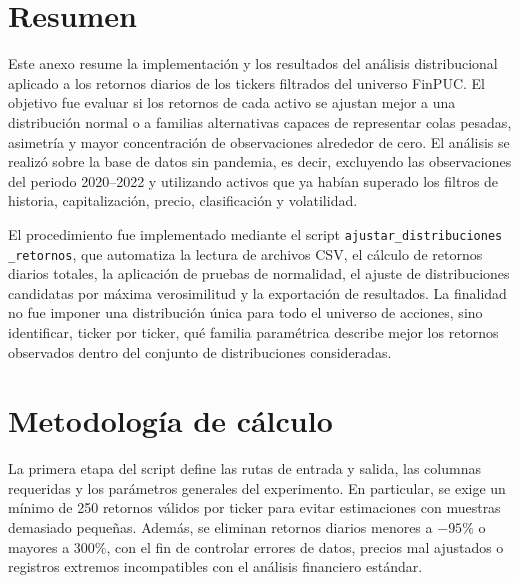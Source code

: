\section*{Resumen}

Este anexo resume la implementaci\'on y los resultados del an\'alisis distribucional aplicado a los retornos diarios de los tickers filtrados del universo FinPUC. El objetivo fue evaluar si los retornos de cada activo se ajustan mejor a una distribuci\'on normal o a familias alternativas capaces de representar colas pesadas, asimetr\'ia y mayor concentraci\'on de observaciones alrededor de cero. El an\'alisis se realiz\'o sobre la base de datos sin pandemia, es decir, excluyendo las observaciones del periodo 2020--2022 y utilizando activos que ya hab\'ian superado los filtros de historia, capitalizaci\'on, precio, clasificaci\'on y volatilidad.

El procedimiento fue implementado mediante el script \texttt{ajustar\_distribuciones} \texttt{\_retornos}, que automatiza la lectura de archivos CSV, el c\'alculo de retornos diarios totales, la aplicaci\'on de pruebas de normalidad, el ajuste de distribuciones candidatas por m\'axima verosimilitud y la exportaci\'on de resultados. La finalidad no fue imponer una distribuci\'on \'unica para todo el universo de acciones, sino identificar, ticker por ticker, qu\'e familia param\'etrica describe mejor los retornos observados dentro del conjunto de distribuciones consideradas.

\section*{Metodolog\'ia de c\'alculo}

La primera etapa del script define las rutas de entrada y salida, las columnas requeridas y los par\'ametros generales del experimento. En particular, se exige un m\'inimo de 250 retornos v\'alidos por ticker para evitar estimaciones con muestras demasiado peque\~nas. Adem\'as, se eliminan retornos diarios menores a $-95\%$ o mayores a $300\%$, con el fin de controlar errores de datos, precios mal ajustados o registros extremos incompatibles con el an\'alisis financiero est\'andar.


